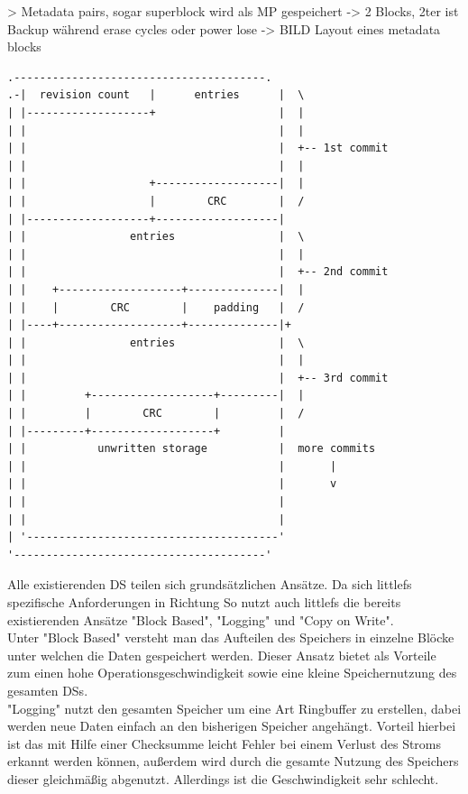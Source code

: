 > Metadata pairs, sogar superblock wird als MP gespeichert
-> 2 Blocks, 2ter ist Backup während erase cycles oder power lose
-> BILD Layout eines metadata blocks
\begin{lstlisting}[basicstyle=\tiny]
  .---------------------------------------.
.-|  revision count   |      entries      |  \
| |-------------------+                   |  |
| |                                       |  |
| |                                       |  +-- 1st commit
| |                                       |  |
| |                   +-------------------|  |
| |                   |        CRC        |  /
| |-------------------+-------------------|
| |                entries                |  \
| |                                       |  |
| |                                       |  +-- 2nd commit
| |    +-------------------+--------------|  |
| |    |        CRC        |    padding   |  /
| |----+-------------------+--------------|+
| |                entries                |  \
| |                                       |  |
| |                                       |  +-- 3rd commit
| |         +-------------------+---------|  |
| |         |        CRC        |         |  /
| |---------+-------------------+         |
| |           unwritten storage           |  more commits
| |                                       |       |
| |                                       |       v
| |                                       |
| |                                       |
| '---------------------------------------'
'---------------------------------------'
\end{lstlisting}


Alle existierenden \acl{DS} teilen sich grundsätzlichen Ansätze.
Da sich littlefs spezifische Anforderungen in Richtung 
So nutzt auch littlefs die bereits existierenden Ansätze "Block Based", "Logging" und "Copy on Write".\\

Unter "Block Based" versteht man das Aufteilen des Speichers in einzelne Blöcke unter welchen die Daten gespeichert werden.
Dieser Ansatz bietet als Vorteile zum einen hohe Operationsgeschwindigkeit sowie eine kleine Speichernutzung des gesamten \acl{DS}s.\\

"Logging" nutzt den gesamten Speicher um eine Art Ringbuffer zu erstellen, dabei werden neue Daten einfach an den bisherigen Speicher angehängt.
Vorteil hierbei ist das mit Hilfe einer Checksumme leicht Fehler bei einem Verlust des Stroms erkannt werden können, außerdem wird durch die gesamte Nutzung
des Speichers dieser gleichmäßig abgenutzt.
Allerdings ist die Geschwindigkeit sehr schlecht.\\

